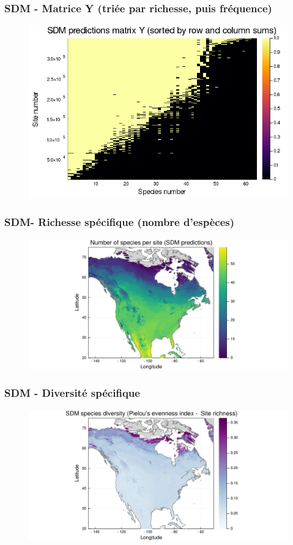 \documentclass[10pt]{beamer}
\begin{document}
\begin{frame}
  \frametitle{SDM - Matrice Y (triée par richesse, puis fréquence)}
  \begin{figure}
    \centering
    \includegraphics[scale=0.4]{fig/sdm-Y-rowcolsorted.png}
  \end{figure}
\end{frame}

\begin{frame}
  \frametitle{SDM- Richesse spécifique (nombre d'espèces)}
  \begin{figure}
    \centering
    \includegraphics[scale=0.4]{fig/sdm-richness.pdf}
  \end{figure}
\end{frame}

\begin{frame}
  \frametitle{SDM - Diversité spécifique}
  \begin{figure}
    \centering
    \includegraphics[scale=0.4]{fig/sdm-diversity-pielou.pdf}
  \end{figure}
\end{frame}
\end{document}
